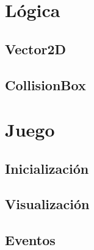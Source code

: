 \documentclass[parskip=half*]{scrartcl}
\begin{document}
\section{L\'ogica}
	\subsection{Vector2D}

	\subsection{CollisionBox}


\newpage
\section{Juego}
	\subsection{Inicializaci\'on}

	\subsection{Visualizaci\'on}

	\subsection{Eventos}

\end{document}

